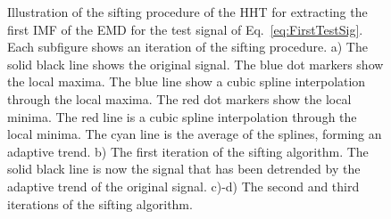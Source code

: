 \documentclass[11pt,draftcls,onecolumn]{IEEEtran}
\begin{document}
\begin{figure}[ht]
	\centering
	\label{fig:HHTDemo}
	\caption{Illustration of the sifting procedure of the HHT for extracting the first IMF of the EMD for the test signal of Eq.~\ref{eq:FirstTestSig}. Each subfigure shows an iteration of the sifting procedure. a) The solid black line shows the original signal. The blue dot markers show the local maxima. The blue line show a cubic spline interpolation through the local maxima. The red dot markers show the local minima. The red line is a cubic spline interpolation through the local minima. The cyan line is the average of the splines, forming an adaptive trend. b) The first iteration of the sifting algorithm. The solid black line is now the signal that has been detrended by the adaptive trend of the original signal. c)-d) The second and third iterations of the sifting algorithm.}
\end{figure}
\end{document}
